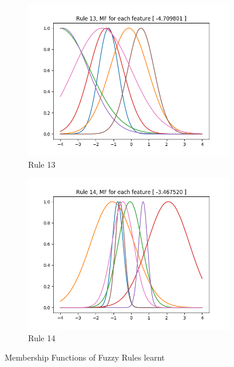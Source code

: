 \documentclass[11pt,a4paper]{article}
\begin{document}
\begin{figure}[htbp]
\ContinuedFloat
\begin{subfigure}{\columnwidth}
  \centering
  \includegraphics[width=\columnwidth,keepaspectratio]{rule-13.png}  
  \caption{Rule 13}
  \label{fig:rules:rule-13}
\end{subfigure}
\begin{subfigure}{\columnwidth}
  \centering
  \includegraphics[width=\columnwidth,keepaspectratio]{rule-14.png}
  \caption{Rule 14}
  \label{fig:rules:rule-14}
\end{subfigure}
\caption{Membership Functions of Fuzzy Rules learnt}
\label{fig:rules}
\end{figure}
\end{document}
